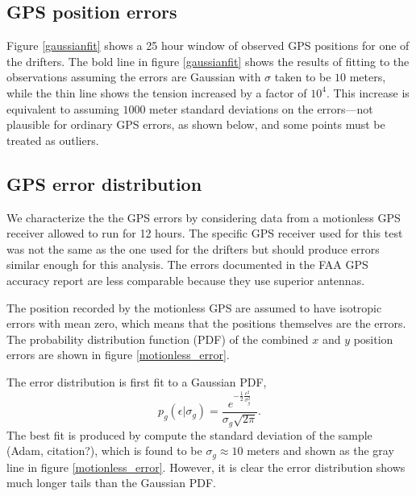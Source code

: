 \documentclass[10pt,journal]{IEEEtran}
\begin{document}
\subsection{GPS position errors}
\label{gps_position_errors}

Figure \ref{gaussianfit} shows a 25 hour window of observed GPS positions for one of the drifters. The bold line in figure \ref{gaussianfit} shows the results of fitting to the observations assuming the errors are Gaussian with $\sigma$ taken to be $10$ meters, while the thin line shows the tension increased by a factor of $10^4$. This increase is equivalent to assuming $1000$ meter standard deviations on the errors---not plausible for ordinary GPS errors, as shown below, and some points must be treated as outliers. 

%
\subsection{GPS error distribution}
%

We characterize the the GPS errors by considering data from a motionless GPS receiver allowed to run for 12 hours. The specific GPS receiver used for this test was not the same as the one used for the drifters but should produce errors similar enough for this analysis. The errors documented in the FAA GPS accuracy report \cite{faa2016-report} are less comparable because they use superior antennas.

The position recorded by the motionless GPS are assumed to have isotropic errors with mean zero, which means that the positions themselves are the errors. The probability distribution function (PDF) of the combined $x$ and $y$ position errors are shown in figure \ref{motionless_error}.

The error distribution is first fit to a Gaussian PDF,
\begin{equation}
p_g(\epsilon|\sigma_g) = \frac{e^{-\frac{1}{2}\frac{\epsilon^2}{\sigma_g^2}} }{\sigma_g \sqrt{ 2 \pi}}.
\end{equation}
The best fit is produced by compute the standard deviation of the sample (Adam, citation?), which is found to be $\sigma_g \approx 10$ meters and shown as the gray line in figure \ref{motionless_error}. However, it is clear the error distribution shows much longer tails than the Gaussian PDF.
\end{document}
